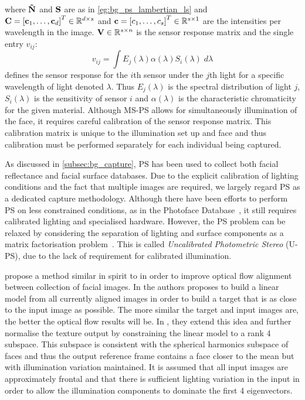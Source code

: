 where $\boldsymbol{\mathbf{\tilde{N}}}$ and $\boldsymbol{\mathbf{S}}$ are as in \cref{eg:bg_ps_lambertian_ls}
and $\boldsymbol{\mathbf{C}} = {[\boldsymbol{\mathbf{c}}_1, \ldots, \boldsymbol{\mathbf{c}}_d]}^T \in \mathbb{R}^{d \times s}$ and
$\boldsymbol{\mathbf{c}} = {[c_1, \ldots, c_s]}^T \in \mathbb{R}^{s \times 1}$ are the intensities
per wavelength in the image. $\boldsymbol{\mathbf{V}} \in \mathbb{R}^{s \times n}$ is the sensor
response matrix and the single entry $v_{ij}$:
\begin{equation}\label{eg:bg_ps_sensor_response}
	v_{ij} = \int E_j(\lambda) \alpha(\lambda) S_i(\lambda) \; d\lambda
\end{equation}
defines the sensor response for the $i$th sensor under the $j$th light for
a specific wavelength of light denoted $\lambda$. Thus $E_j(\lambda)$ is the
spectral distribution of light $j$, $S_i(\lambda)$ is the sensitivity
of sensor $i$ and $\alpha(\lambda)$ is the characteristic chromaticity for the
given material. Although MS-PS allows for simultaneously illumination of the
face, it requires careful calibration of the sensor response matrix. This
calibration matrix is unique to the illumination set up and face and thus
calibration must be performed separately for each individual
being captured.

As discussed in \cref{subsec:bg_capture}, PS has been used to collect both
facial reflectance and facial surface databases. Due to the explicit
calibration of lighting conditions and the fact that multiple images are
required, we largely regard PS as a dedicated capture methodology. Although
there have been efforts to perform PS on less constrained conditions, as in
the Photoface Database~\cite{zafeiriou2013photoface}, it still requires calibrated
lighting and specialised hardware. However, the PS problem can be relaxed by
considering the separation of lighting and surface components as a matrix
factorisation problem~\cite{basri2007photometric,hayakawa1994photometric}. 
This is called \textit{Uncalibrated Photometric Stereo} (U-PS),
due to the lack of requirement for calibrated illumination.

\citet{kemelmacher2012collection} propose a method similar in spirit to
\citet{vetter1997bootstrapping} in order to improve optical flow alignment
between collection of facial images. In \citet{vetter1997bootstrapping} the
authors proposes to build a linear model from all currently aligned images in
order to build a target that is as close to the input image as possible. The
more similar the target and input images are, the better the optical flow
results will be. In \citet{kemelmacher2012collection}, they extend this
idea and further normalise the texture output by constraining the linear
model to a rank 4 subspace. This subspace is consistent with the spherical 
harmonics subspace of faces and thus the output reference frame contains 
a face closer to the mean but with illumination variation maintained. It is 
assumed that all input images are approximately frontal and that there is 
sufficient lighting variation in the input in order to allow the illumination
components to dominate the first 4 eigenvectors.

